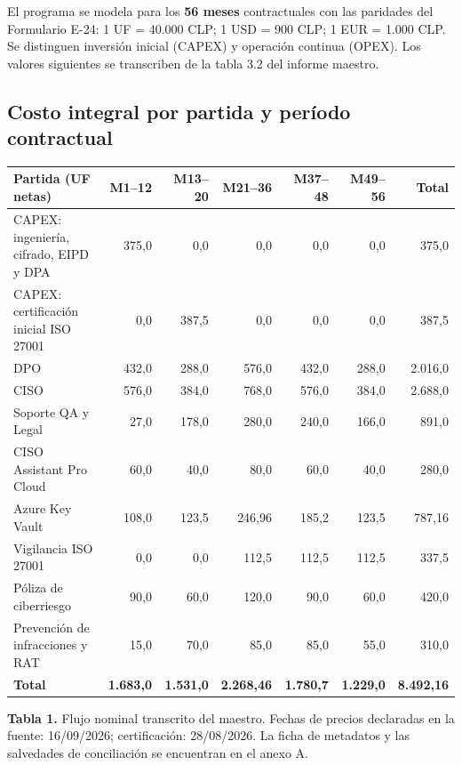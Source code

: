 El programa se modela para los \textbf{56 meses} contractuales con las paridades del Formulario E-24: 1 UF = 40.000 CLP; 1 USD = 900 CLP; 1 EUR = 1.000 CLP. Se distinguen inversión inicial (CAPEX) y operación continua (OPEX). Los valores siguientes se transcriben de la tabla 3.2 del informe maestro.

\subsection{Costo integral por partida y período contractual}
\begin{center}
\footnotesize\setlength{\tabcolsep}{3pt}\renewcommand{\arraystretch}{1.4}
\begin{tabularx}{\linewidth}{@{}Xrrrrrr@{}}
\toprule
\textbf{Partida (UF netas)} & \textbf{M1--12} & \textbf{M13--20} & \textbf{M21--36} & \textbf{M37--48} & \textbf{M49--56} & \textbf{Total}\\\midrule
CAPEX: ingeniería, cifrado, EIPD y DPA & 375,0 & 0,0 & 0,0 & 0,0 & 0,0 & 375,0\\
CAPEX: certificación inicial ISO 27001 & 0,0 & 387,5 & 0,0 & 0,0 & 0,0 & 387,5\\
DPO & 432,0 & 288,0 & 576,0 & 432,0 & 288,0 & 2.016,0\\
CISO & 576,0 & 384,0 & 768,0 & 576,0 & 384,0 & 2.688,0\\
Soporte QA y Legal & 27,0 & 178,0 & 280,0 & 240,0 & 166,0 & 891,0\\
CISO Assistant Pro Cloud & 60,0 & 40,0 & 80,0 & 60,0 & 40,0 & 280,0\\
Azure Key Vault & 108,0 & 123,5 & 246,96 & 185,2 & 123,5 & 787,16\\
Vigilancia ISO 27001 & 0,0 & 0,0 & 112,5 & 112,5 & 112,5 & 337,5\\
Póliza de ciberriesgo & 90,0 & 60,0 & 120,0 & 90,0 & 60,0 & 420,0\\
Prevención de infracciones y RAT & 15,0 & 70,0 & 85,0 & 85,0 & 55,0 & 310,0\\\midrule
\rowcolor{pale}\textbf{Total} & \textbf{1.683,0} & \textbf{1.531,0} & \textbf{2.268,46} & \textbf{1.780,7} & \textbf{1.229,0} & \textbf{8.492,16}\\
\bottomrule
\end{tabularx}
\end{center}
{\footnotesize\textbf{Tabla 1.} Flujo nominal transcrito del maestro. Fechas de precios declaradas en la fuente: 16/09/2026; certificación: 28/08/2026. La ficha de metadatos y las salvedades de conciliación se encuentran en el anexo A.}

